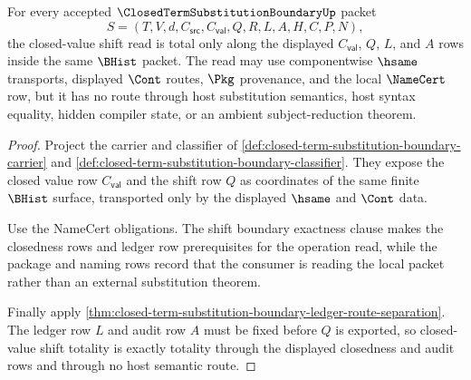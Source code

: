 \begin{theorem}
\label{thm:closed-term-substitution-boundary-closed-value-shift-totality}
For every accepted $\ClosedTermSubstitutionBoundaryUp$ packet
$$
S=(T,V,d,C_{\mathsf{src}},C_{\mathsf{val}},Q,R,L,A,H,C,P,N),
$$
the closed-value shift read is total only along the displayed
$C_{\mathsf{val}}$, $Q$, $L$, and $A$ rows inside the same $\BHist$ packet. The
read may use componentwise $\hsame$ transports, displayed $\Cont$ routes,
$\Pkg$ provenance, and the local $\NameCert$ row, but it has no route through
host substitution semantics, host syntax equality, hidden compiler state, or an
ambient subject-reduction theorem.
\end{theorem}
\begin{proof}
Project the carrier and classifier of
\autoref{def:closed-term-substitution-boundary-carrier} and
\autoref{def:closed-term-substitution-boundary-classifier}. They expose the
closed value row $C_{\mathsf{val}}$ and the shift row $Q$ as coordinates of the
same finite $\BHist$ surface, transported only by the displayed $\hsame$ and
$\Cont$ data.

Use the NameCert obligations. The shift boundary exactness clause makes the
closedness rows and ledger row prerequisites for the operation read, while the
package and naming rows record that the consumer is reading the local packet
rather than an external substitution theorem.

Finally apply \autoref{thm:closed-term-substitution-boundary-ledger-route-separation}.
The ledger row $L$ and audit row $A$ must be fixed before $Q$ is exported, so
closed-value shift totality is exactly totality through the displayed
closedness and audit rows and through no host semantic route.
\end{proof}

